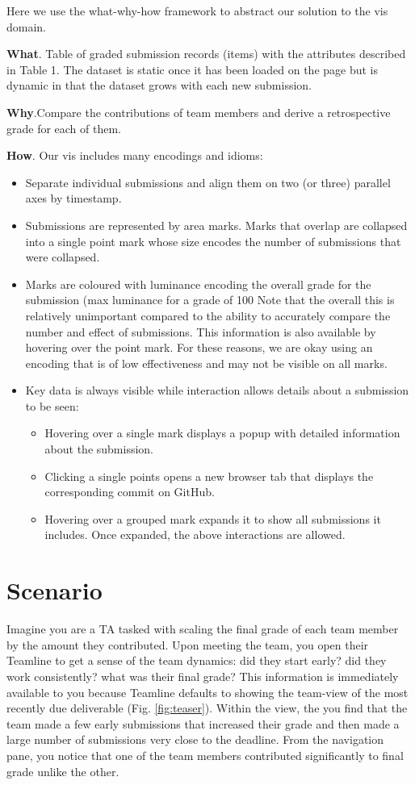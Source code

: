 \documentclass[preprint,journal]{vgtc}       %
\begin{document}
Here we use the what-why-how framework \cite{Munzner:2014} to abstract our solution to the vis domain.

\textbf{What}. Table of graded submission records (items) with the attributes
described in Table 1. The dataset is static once it has been loaded on the page
but is dynamic in that the dataset grows with each new submission.

\textbf{Why}.Compare the contributions of team members and derive a retrospective
grade for each of them.

\textbf{How}. Our vis includes many encodings and idioms:
\begin{itemize}
  \item Separate individual submissions and align them on two (or three)
        parallel axes by timestamp.
  \item Submissions are represented by area marks. Marks that overlap are collapsed into
    a single point mark whose size encodes the number of submissions that were collapsed.
  \item Marks are coloured with luminance encoding the overall grade for the submission (max luminance for a grade of 100%
    Note that the overall this is relatively unimportant compared to the ability to
    accurately compare the number and effect of submissions. This information is also available
    by hovering over the point mark. For these reasons, we are okay using an encoding
    that is of low effectiveness and may not be visible on all marks.
  \item Key data is always visible while interaction allows details about a submission to
    be seen:
    \begin{itemize}
      \item Hovering over a single mark displays a popup with detailed information about the submission.
      \item Clicking a single points opens a new browser tab that displays the corresponding commit on GitHub.
      \item Hovering over a grouped mark expands it to show all submissions it includes. Once expanded,
        the above interactions are allowed.
    \end{itemize}
\end{itemize}

\section{Scenario}
Imagine you are a TA tasked with scaling the final grade of each team member by
the amount they contributed. Upon meeting the team, you open their Teamline to
get a sense of the team dynamics: did they start early? did they work consistently?
what was their final grade? This information is immediately available to you
because Teamline defaults to showing the team-view of the most recently due deliverable (Fig. \ref{fig:teaser}).
Within the view, the you find that the team made a few early submissions that
increased their grade and then made a large number of submissions very close to
the deadline. From the navigation pane, you notice that one of the team members
contributed significantly to final grade unlike the other.
\end{document}
